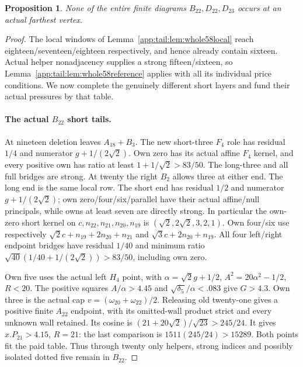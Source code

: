 \documentclass[11pt]{article}
\newtheorem{proposition}[theorem]{Proposition}
\theoremstyle{definition}
\theoremstyle{remark}
\begin{document}
\begin{proposition}
\label{app:tail:prop:whole58}
None of the entire finite diagrams $B_{22},D_{22},D_{23}$ occurs at
an actual farthest vertex.
\end{proposition}
\begin{proof}
The local windows of Lemma~\ref{app:tail:lem:whole58local} reach
eighteen/seventeen/eighteen respectively, and hence already contain
sixteen. Actual helper nonadjacency supplies a strong fifteen/sixteen,
so Lemma~\ref{app:tail:lem:whole58reference} applies with all its
individual price conditions. We now complete the genuinely different
short layers and fund their actual pressures by that table.

\paragraph{The actual $B_{22}$ short tails.}
At nineteen deletion leaves $A_{18}+B_3$. The new short-three $F_4$
role has residual $1/4$ and numerator $g+1/(2\sqrt2)$.
Own zero has its actual affine $F_4$ kernel, and every positive own
has ratio at least $1+1/\sqrt2>83/50$. The long-three and all full
bridges are strong. At twenty the right $B_2$ allows three at either
end. The long end is the same local row. The short end has residual
$1/2$ and numerator $g+1/(2\sqrt2)$; own zero/four/six/parallel
have their actual affine/null principals, while owns at least seven
are directly strong. In particular the own-zero short kernel on
$c,n_{22},n_{21},n_{20},n_{19}$ is
$(\sqrt2,2\sqrt2,3,2,1)$. Own four/six use respectively
$\sqrt2c+n_{19}+2n_{20}+n_{21}$ and
$\sqrt3c+2n_{20}+n_{19}$. All four left/right endpoint bridges
have residual $1/40$ and minimum ratio
$\sqrt{40}(1/40+1/(2\sqrt2))>83/50$, including own zero.

Own five uses the actual left $H_4$ point, with
$\alpha=\sqrt2g+1/2$, $A^2=20\alpha^2-1/2$, $R<20$.
The positive squares $A/\alpha>4.45$ and
$\sqrt{\delta_5}/\alpha<.083$ give $G>4.3$.
Own three is the actual cap $v=(\omega_{20}+\omega_{22})/2$.
Releasing old twenty-one gives a positive finite $A_{22}$ endpoint,
with its omitted-wall product strict and every unknown wall retained.
Its cosine is $(21+20\sqrt2)/\sqrt{23}>245/24$.
It gives $x.P_{21}>4.15$, $R=21$: the last comparison is
$1511(245/24)>15289$. Both points fit the paid table. Thus through
twenty only helpers, strong indices and possibly isolated dotted five
remain in $B_{22}$.


\end{proof}
\end{document}
